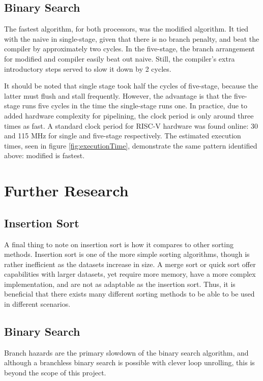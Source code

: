 \documentclass[lettersize,journal]{IEEEtran}
\begin{document}
	\subsection{Binary Search}
    The fastest algorithm, for both processors, was the modified algorithm. It tied with the naive in single-stage, given that there is no branch penalty, and beat the compiler by approximately two cycles. In the five-stage, the branch arrangement for modified and compiler easily beat out naive. Still, the compiler's extra introductory steps served to slow it down by 2 cycles.

    It should be noted that single stage took half the cycles of five-stage, because the latter must flush and stall frequently. However, the advantage is that the five-stage runs five cycles in the time the single-stage runs one. In practice, due to added hardware complexity for pipelining, the clock period is only around three times as fast. A standard clock period for RISC-V hardware was found online: 30 and 115 MHz for single and five-stage respectively. The estimated execution times, seen in figure \ref{fig:executionTime}, demonstrate the same pattern identified above: modified is fastest.

\section{Further Research}
  \subsection{Insertion Sort}
		A final thing to note on insertion sort is how it compares to other sorting methods. Insertion sort is one of the more simple sorting algorithms, though is rather inefficient as the datasets increase in size. A merge sort or quick sort offer capabilities with larger datasets, yet require more memory, have a more complex implementation, and are not as adaptable as the insertion sort\cite{ref4}. Thus, it is beneficial that there exists many different sorting methods to be able to be used in different scenarios.
	\subsection{Binary Search}
    Branch hazards are the primary slowdown of the binary search algorithm, and although a branchless binary search is possible with clever loop unrolling\cite{ref2}\cite{ref3}, this is beyond the scope of this project.
\end{document}
